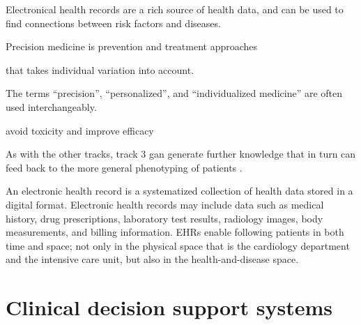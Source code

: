 Electronical health records are a rich source of health data,
and can be used to find connections between risk factors and diseases.

Precision medicine is prevention and treatment approaches

that takes individual variation into account.


The terms
\enquote{precision},
\enquote{personalized},
and \enquote{individualized medicine}
are often used interchangeably.

avoid toxicity and improve efficacy



As with the other tracks, track 3 gan generate further knowledge 
that in turn can feed back to the more general phenotyping of patients
\autocite{konigWhat2017}. 

An electronic health record
is a systematized collection of health data 
stored in a digital format.
Electronic health records may include data such as
medical history, drug prescriptions, laboratory test results,
radiology images, body measurements, and billing information.
EHRs enable following patients in both time and space;
not only in the physical space that is the cardiology department
and the intensive care unit, but also in the health-and-disease space.



\section{Clinical decision support systems}

